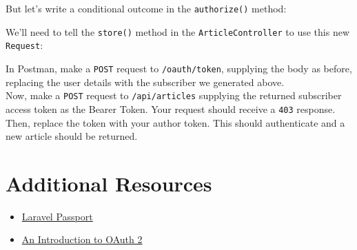 But let's write a conditional outcome in the \texttt{authorize()} method:


We'll need to tell the \texttt{store()} method in the \texttt{ArticleController} to use this new \texttt{Request}:



In Postman, make a \texttt{POST} request to \texttt{/oauth/token}, supplying the body as before, replacing the user details with the subscriber we generated above.
\\

Now, make a \texttt{POST} request to \texttt{/api/articles} supplying the returned subscriber access token as the Bearer Token. Your request should receive a \texttt{403} response. Then, replace the token with your author token. This should authenticate and a new article should be returned.

\section{Additional Resources}

\begin{itemize}[leftmargin=*]
    \item \href{https://laravel.com/docs/master/passport}{Laravel Passport}
    \item \href{https://www.digitalocean.com/community/tutorials/an-introduction-to-oauth-2}{An Introduction to OAuth 2}
\end{itemize}
